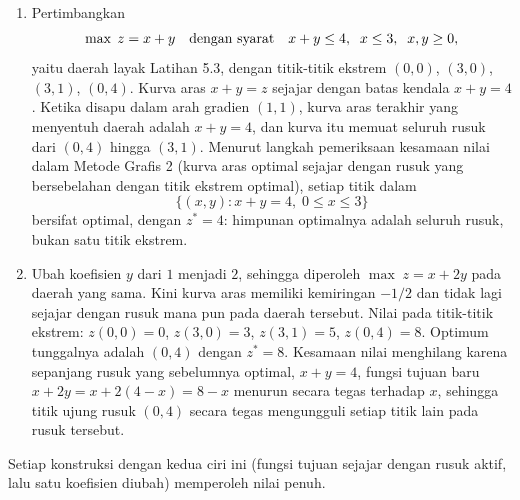 \begin{enumerate}
\item Pertimbangkan
\[
\max\; z = x + y \quad \mbox{dengan syarat}\quad x + y \leq 4, \;\; x \leq 3, \;\; x, y \geq 0,
\]
yaitu daerah layak Latihan 5.3, dengan titik-titik ekstrem $(0,0)$, $(3,0)$, $(3,1)$, $(0,4)$. Kurva aras $x + y = z$ sejajar dengan batas kendala $x + y = 4$. Ketika disapu dalam arah gradien $(1,1)$, kurva aras terakhir yang menyentuh daerah adalah $x + y = 4$, dan kurva itu memuat seluruh rusuk dari $(0,4)$ hingga $(3,1)$. Menurut langkah pemeriksaan kesamaan nilai dalam Metode Grafis 2 (kurva aras optimal sejajar dengan rusuk yang bersebelahan dengan titik ekstrem optimal), setiap titik dalam
\[
\{ (x, y) : x + y = 4,\; 0 \leq x \leq 3 \}
\]
bersifat optimal, dengan $z^* = 4$: himpunan optimalnya adalah seluruh rusuk, bukan satu titik ekstrem.
\item Ubah koefisien $y$ dari $1$ menjadi $2$, sehingga diperoleh $\max\; z = x + 2y$ pada daerah yang sama. Kini kurva aras memiliki kemiringan $-1/2$ dan tidak lagi sejajar dengan rusuk mana pun pada daerah tersebut. Nilai pada titik-titik ekstrem: $z(0,0)=0$, $z(3,0)=3$, $z(3,1)=5$, $z(0,4)=8$. Optimum tunggalnya adalah $(0,4)$ dengan $z^* = 8$. Kesamaan nilai menghilang karena sepanjang rusuk yang sebelumnya optimal, $x + y = 4$, fungsi tujuan baru $x + 2y = x + 2(4 - x) = 8 - x$ menurun secara tegas terhadap $x$, sehingga titik ujung rusuk $(0,4)$ secara tegas mengungguli setiap titik lain pada rusuk tersebut.
\end{enumerate}
Setiap konstruksi dengan kedua ciri ini (fungsi tujuan sejajar dengan rusuk aktif, lalu satu koefisien diubah) memperoleh nilai penuh.
